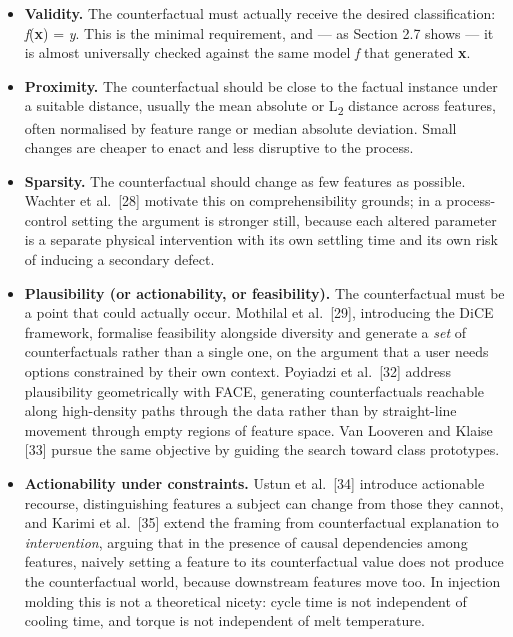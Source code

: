 \begin{itemize}
\tightlist
\item
  \textbf{Validity.} The counterfactual must actually receive the desired classification: \emph{f}(\textbf{x}\textquotesingle{}) = \emph{y}\textquotesingle{}. This is the minimal requirement, and --- as Section 2.7 shows --- it is almost universally checked against the same model \emph{f} that generated \textbf{x}\textquotesingle{}.
\item
  \textbf{Proximity.} The counterfactual should be close to the factual instance under a suitable distance, usually the mean absolute or L\textsubscript{2} distance across features, often normalised by feature range or median absolute deviation. Small changes are cheaper to enact and less disruptive to the process.
\item
  \textbf{Sparsity.} The counterfactual should change as few features as possible. Wachter et al.~{[}28{]} motivate this on comprehensibility grounds; in a process-control setting the argument is stronger still, because each altered parameter is a separate physical intervention with its own settling time and its own risk of inducing a secondary defect.
\item
  \textbf{Plausibility (or actionability, or feasibility).} The counterfactual must be a point that could actually occur. Mothilal et al.~{[}29{]}, introducing the DiCE framework, formalise feasibility alongside diversity and generate a \emph{set} of counterfactuals rather than a single one, on the argument that a user needs options constrained by their own context. Poyiadzi et al.~{[}32{]} address plausibility geometrically with FACE, generating counterfactuals reachable along high-density paths through the data rather than by straight-line movement through empty regions of feature space. Van Looveren and Klaise {[}33{]} pursue the same objective by guiding the search toward class prototypes.
\item
  \textbf{Actionability under constraints.} Ustun et al.~{[}34{]} introduce actionable recourse, distinguishing features a subject can change from those they cannot, and Karimi et al.~{[}35{]} extend the framing from counterfactual explanation to \emph{intervention}, arguing that in the presence of causal dependencies among features, naively setting a feature to its counterfactual value does not produce the counterfactual world, because downstream features move too. In injection molding this is not a theoretical nicety: cycle time is not independent of cooling time, and torque is not independent of melt temperature.
\end{itemize}

